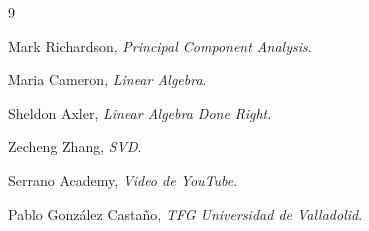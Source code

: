 \begin{thebibliography}{9}

	Mark Richardson, \emph{Principal Component Analysis}.

	Maria Cameron, \emph{Linear Algebra}.

	Sheldon Axler, \emph{Linear Algebra Done Right}.

	Zecheng Zhang, \emph{SVD}.

	Serrano Academy, \emph{Video de YouTube}.

	Pablo González Castaño, \emph{TFG Universidad de Valladolid}.

\end{thebibliography}
